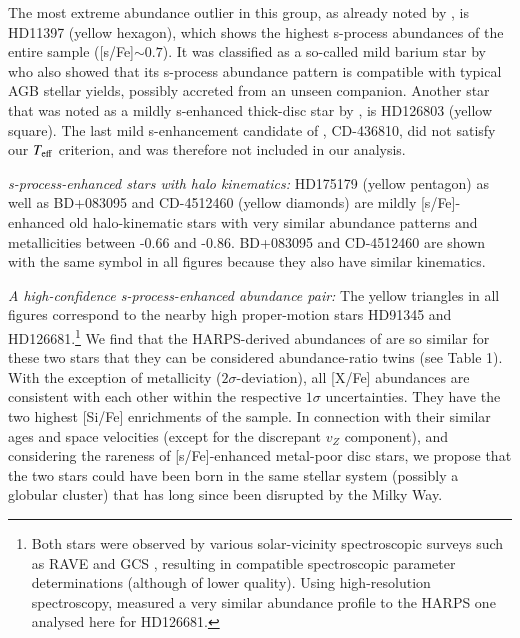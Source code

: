\documentclass{aa}  %
\begin{document}
The most extreme abundance outlier in this group, as already noted by \citet{DelgadoMena2017}, is HD11397 (yellow hexagon), which shows the highest s-process abundances of the entire sample ([s/Fe]$\sim0.7$). It was classified as a so-called mild barium star by \citet{Pompeia2008} who also showed that its s-process abundance pattern is compatible with typical AGB stellar yields, possibly accreted from an unseen companion. 
Another star that was noted as a mildly s-enhanced thick-disc star by \citet{DelgadoMena2017}, is HD126803 (yellow square). The last mild s-enhancement candidate of \citet{DelgadoMena2017}, CD-436810, did not satisfy our $T_{\rm eff}$ criterion, and was therefore not included in our analysis. 

{\it s-process-enhanced stars with halo kinematics:} HD175179 (yellow pentagon) as well as BD+083095 and CD-4512460 (yellow diamonds) are mildly [s/Fe]-enhanced old halo-kinematic stars with very similar abundance patterns and metallicities between -0.66 and -0.86. BD+083095 and CD-4512460 are shown with the same symbol in all figures because they also have similar kinematics. %

{\it A high-confidence s-process-enhanced abundance pair:} The yellow triangles in all figures correspond to the nearby high proper-motion stars HD91345 and HD126681.\footnote{Both stars were observed by various solar-vicinity spectroscopic surveys such as RAVE \citep{Steinmetz2006, Kunder2017} and GCS \citep{Nordstroem2004, Casagrande2011}, resulting in compatible spectroscopic parameter determinations (although of lower quality). Using high-resolution spectroscopy, \citet{Bensby2014} measured a very similar abundance profile to the HARPS one analysed here for HD126681.} We find that the HARPS-derived abundances of \citet{DelgadoMena2017} are so similar for these two stars that they can be considered abundance-ratio twins (see Table 1). With the exception of metallicity ($2\sigma$-deviation), all [X/Fe] abundances are consistent with each other within the respective $1\sigma$ uncertainties. They have the two highest [Si/Fe] enrichments of the sample. In connection with their similar ages and space velocities (except for the discrepant $v_Z$ component), and considering the rareness of [s/Fe]-enhanced metal-poor disc stars, we propose that the two stars could have been born in the same stellar system (possibly a globular cluster) that has long since been disrupted by the Milky Way.
\end{document}
